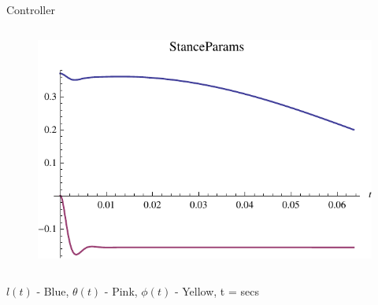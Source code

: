 \begin{frame}
\begin{block}{Controller}
\begin{columns}
  \begin{figure}
  \centering
  \includegraphics[scale=0.45]{fig/inplace_pStance_params.pdf}
  \end{figure}
  \end{columns}
  \begin{itemize}
    {
    \small
    \item 
    $l(t)$ - Blue, $\theta(t)$ - Pink, $\phi(t)$ - Yellow, t = secs
    }
  \end{itemize}

\end{block}

\end{frame}

